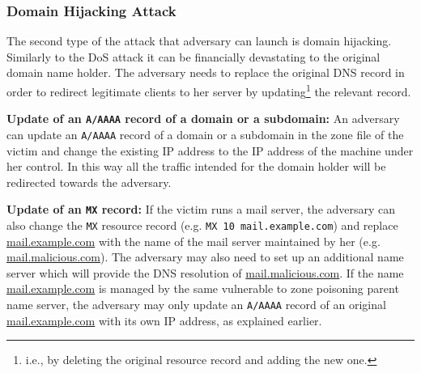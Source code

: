 \begin{comment}
\textbf{Deletion or modification of a \texttt{PTR} record:} 
A \texttt{PTR} record, or a reverse DNS of an IP, translates the IP address to its hostname.
The \texttt{PTR} record is used by different services, notably by e-mail anti-spam techniques to protect recipients from phishing attacks.
Most of receiving mail server checks if the IP address of the sending mail server has a \texttt{PTR} record and if it matches the IP obtained via the forward DNS resolution of the hostname defined in the \texttt{PTR} record.
Emails without the \texttt{PTR} record may get rejected or marked as spam, therefore, the adversary could modify or completely delete the \texttt{PTR} record to prevent recipients from receiving legitimate emails.

The tricky part is that the PTR record is not configured by the DNS service provider but by the ISP, so zone poisoning fails.
\end{comment}


\subsubsection{Domain Hijacking Attack}
The second type of the attack that adversary can launch is domain hijacking. 
Similarly to the DoS attack it can be financially devastating to the original domain name holder.
The adversary needs to replace the original DNS record in order to redirect legitimate clients to her server by updating\footnote{i.e., by deleting the original resource record and adding the new one.} the relevant record.

\textbf{Update of an \texttt{A/AAAA} record of a domain or a subdomain:}
An adversary can update an \texttt{A/AAAA} record of a domain or a subdomain in the zone file of the victim and change the existing IP address to the IP address of the machine under her control.
In this way all the traffic intended for the domain holder will be redirected towards the adversary.

\textbf{Update of an \texttt{MX} record:} 
If the victim runs a mail server, the adversary can also change the \texttt{MX} resource record (e.g. \texttt{MX  10 mail.example.com}) and replace \url{mail.example.com} with the name of the mail server maintained by her (e.g. \url{mail.malicious.com}).
The adversary may also need to set up an additional name server which will provide the DNS resolution of \url{mail.malicious.com}.
If the name \url{mail.example.com} is managed by the same vulnerable to zone poisoning parent name server, the adversary may only update an \texttt{A/AAAA}  record of an original \url{mail.example.com} with its own IP address, as explained earlier.


